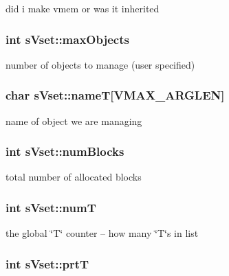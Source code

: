 did i make vmem or was it inherited 

\subsubsection[{max\-Objects}]{\setlength{\rightskip}{0pt plus 5cm}int s\-Vset\-::max\-Objects}\label{a00006_ae969fd9a7dc5ba70e7011267464813b8}


number of objects to manage (user specified) 

\subsubsection[{name\-T}]{\setlength{\rightskip}{0pt plus 5cm}char s\-Vset\-::name\-T[{\bf V\-M\-A\-X\-\_\-\-A\-R\-G\-L\-E\-N}]}\label{a00006_a3c0d8879ad1e04fbeefde96afa3d6f18}


name of object we are managing 

\subsubsection[{num\-Blocks}]{\setlength{\rightskip}{0pt plus 5cm}int s\-Vset\-::num\-Blocks}\label{a00006_a7c8f23f767a2a19c9e3f25367908d73c}


total number of allocated blocks 

\subsubsection[{num\-T}]{\setlength{\rightskip}{0pt plus 5cm}int s\-Vset\-::num\-T}\label{a00006_af1009ccf64c7ca388fca7f81c4fdd003}


the global \char`\"{}\-T\char`\"{} counter -- how many \char`\"{}\-T\char`\"{}s in list 

\subsubsection[{prt\-T}]{\setlength{\rightskip}{0pt plus 5cm}int s\-Vset\-::prt\-T}\label{a00006_a8a9db3d22f89bd9b7ea2fdab710d885f}


